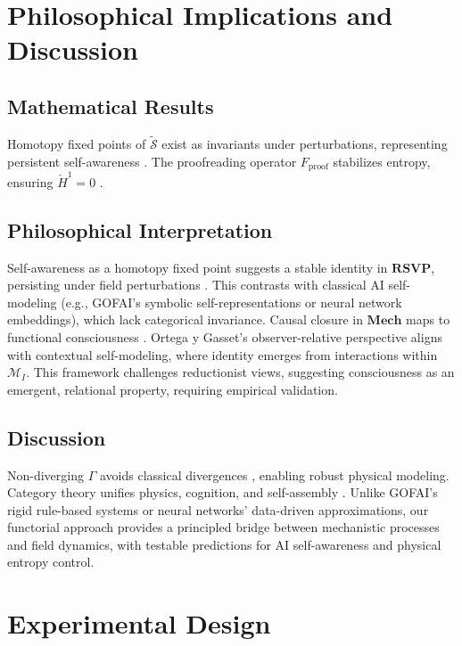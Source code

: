 \documentclass{article}
\theoremstyle{plain}
\theoremstyle{definition}
\begin{document}
\section{Philosophical Implications and Discussion}

\subsection{Mathematical Results}
Homotopy fixed points of $\widetilde{\mathcal{S}}$ exist as invariants under perturbations, representing persistent self-awareness \cite{Awodey2010}. The proofreading operator $F_\text{proof}$ stabilizes entropy, ensuring $\check{H}^1 = 0$ \cite{Liang2025}.

\subsection{Philosophical Interpretation}
Self-awareness as a homotopy fixed point suggests a stable identity in $\mathbf{RSVP}$, persisting under field perturbations \cite{Bennett2025}. This contrasts with classical AI self-modeling (e.g., GOFAI’s symbolic self-representations or neural network embeddings), which lack categorical invariance. Causal closure in $\mathbf{Mech}$ maps to functional consciousness \cite{Pearl2009,Goguen1992}. Ortega y Gasset’s observer-relative perspective \cite{Ortega1931} aligns with contextual self-modeling, where identity emerges from interactions within $\mathcal{M}_I$. This framework challenges reductionist views, suggesting consciousness as an emergent, relational property, requiring empirical validation.

\subsection{Discussion}
Non-diverging $\Gamma$ avoids classical divergences \cite{Soares2023prb}, enabling robust physical modeling. Category theory unifies physics, cognition, and self-assembly \cite{Spivak2014,Goguen1992,Liang2025}. Unlike GOFAI’s rigid rule-based systems or neural networks’ data-driven approximations, our functorial approach provides a principled bridge between mechanistic processes and field dynamics, with testable predictions for AI self-awareness and physical entropy control.

\section{Experimental Design}
\end{document}
